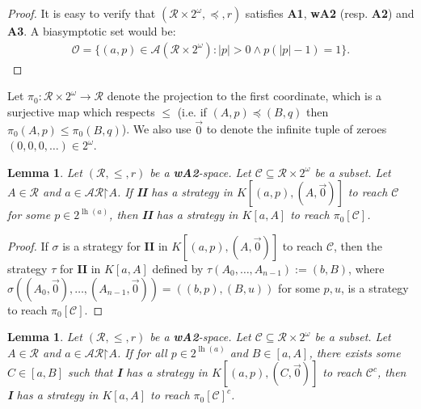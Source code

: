 \documentclass[11pt,reqno]{amsart}
\theoremstyle{plain}
\numberwithin{equation}{section}
\newtheorem{lemma}[theorem]{Lemma}
\theoremstyle{definition}
\newcommand{\func}{\operatorname}
\newcommand{\cal}{\mathcal}
\newcommand{\restrictedto}{\mathord{\upharpoonright}}
\newcommand{\lh}{\func{lh}}
\renewcommand{\O}{\cal{O}}
\begin{document}
\begin{proof}
    It is easy to verify that $(\cal{R} \times 2^\omega,\preceq,r)$ satisfies \textbf{A1}, \textbf{wA2} (resp. \textbf{A2}) and \textbf{A3}. A biasymptotic set would be:
    \begin{align*}
        \O = \{(a,p) \in \cal{A}(\cal{R} \times 2^\omega) : |p| > 0 \wedge p(|p|-1) = 1\}.
    \end{align*}
\end{proof}

Let $\pi_0 : \cal{R} \times 2^\omega \to \cal{R}$ denote the projection to the first coordinate, which is a surjective map which respects $\leq$ (i.e. if $(A,p) \preceq (B,q)$ then $\pi_0(A,p) \leq \pi_0(B,q)$). We also use $\vec{0}$ to denote the infinite tuple of zeroes $(0,0,0,\dots) \in 2^\omega$.

\begin{lemma}
    Let $(\cal{R},\leq,r)$ be a \textbf{wA2}-space. Let $\cal{C} \subseteq \cal{R} \times 2^\omega$ be a subset. Let $A \in \cal{R}$ and $a \in \cal{AR}\restrictedto A$. If \textbf{II} has a strategy in $K[(a,p),(A,\vec{0})]$ to reach $\cal{C}$ for some $p \in 2^{\lh(a)}$, then \textbf{II} has a strategy in $K[a,A]$ to reach $\pi_0[\cal{C}]$.
\end{lemma}

\begin{proof}
    If $\sigma$ is a strategy for \textbf{II} in $K[(a,p),(A,\vec{0})]$ to reach $\cal{C}$, then the strategy $\tau$ for \textbf{II} in $K[a,A]$ defined by $\tau(A_0,\dots,A_{n-1}) := (b,B)$, where $\sigma((A_0,\vec{0}),\dots,(A_{n-1},\vec{0})) = ((b,p),(B,u))$ for some $p,u$, is a strategy to reach $\pi_0[\cal{C}]$.
\end{proof}

\begin{lemma}
    Let $(\cal{R},\leq,r)$ be a \textbf{wA2}-space. Let $\cal{C} \subseteq \cal{R} \times 2^\omega$ be a subset. Let $A \in \cal{R}$ and $a \in \cal{AR}\restrictedto A$. If for all $p \in 2^{\lh(a)}$ and $B \in [a,A]$, there exists some $C \in [a,B]$ such that \textbf{I} has a strategy in $K[(a,p),(C,\vec{0})]$ to reach $\cal{C}^c$, then \textbf{I} has a strategy in $K[a,A]$ to reach $\pi_0[\cal{C}]^c$.
\end{lemma}
\end{document}
